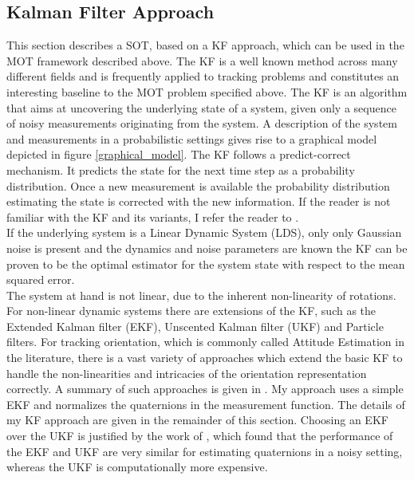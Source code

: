 \documentclass[12pt,a4paper]{article}
\begin{document}
 


\subsection{Kalman Filter Approach}
\label{kf_appraoch}
This section describes a SOT, based on a KF approach, which can be used in the MOT framework described above. The KF is a well known method across many different fields and is frequently applied to tracking problems and constitutes an interesting baseline to the MOT problem specified above. The KF is an algorithm that aims at uncovering the underlying state of a system, given only a sequence of noisy measurements originating from the system. A description of the system and measurements in a probabilistic settings gives rise to a graphical model depicted in figure \ref{graphical_model}. The KF follows a predict-correct mechanism. It predicts the state for the next time step as a probability distribution. Once a new measurement is available the probability distribution estimating the state is corrected with the new information. If the reader is not familiar with the KF and its variants, I refer the reader to \cite[Chapter~19]{prince}.\\

If the underlying system is a Linear Dynamic System (LDS), only only Gaussian noise is present and the dynamics and noise parameters are known the KF can be proven to be the optimal estimator for the system state with respect to the mean squared error. \\
The system at hand is not linear, due to the inherent non-linearity of rotations. For non-linear dynamic systems there are extensions of the KF, such as the Extended Kalman filter (EKF), Unscented Kalman filter (UKF) and Particle filters. For tracking orientation, which is commonly called Attitude Estimation in the literature, there is a vast variety of approaches which extend the basic KF to handle the non-linearities and intricacies of the orientation representation correctly. A summary of such approaches is given in \cite{attitude_estimation}. My approach uses a simple EKF and normalizes the quaternions in the measurement function. The details of my KF approach are given in the remainder of this section. Choosing an EKF over the UKF is justified by the work of \cite{EKFvsUKF}, which found that the performance of the EKF and UKF are very similar for estimating quaternions in a noisy setting, whereas the UKF is computationally more expensive.
\end{document}

